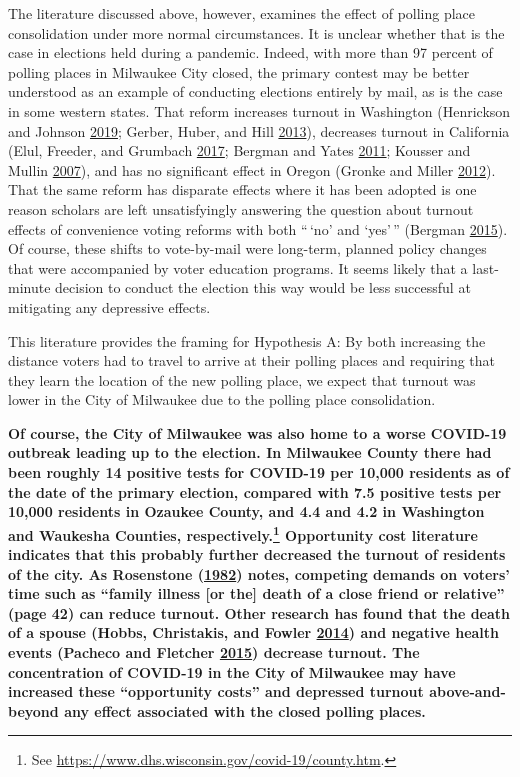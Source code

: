 \documentclass[
  12pt,
]{article}
\begin{document}
The literature discussed above, however, examines the effect of polling place consolidation under more normal circumstances. It is unclear whether that is the case in elections held during a pandemic. Indeed, with more than 97 percent of polling places in Milwaukee City closed, the primary contest may be better understood as an example of conducting elections entirely by mail, as is the case in some western states. That reform increases turnout in Washington (Henrickson and Johnson \protect\hyperlink{ref-Henrickson2019}{2019}; Gerber, Huber, and Hill \protect\hyperlink{ref-Gerber2013}{2013}), decreases turnout in California (Elul, Freeder, and Grumbach \protect\hyperlink{ref-Elul2017}{2017}; Bergman and Yates \protect\hyperlink{ref-Bergman2011}{2011}; Kousser and Mullin \protect\hyperlink{ref-Kousser2007}{2007}), and has no significant effect in Oregon (Gronke and Miller \protect\hyperlink{ref-Gronke2012}{2012}). That the same reform has disparate effects where it has been adopted is one reason scholars are left unsatisfyingly answering the question about turnout effects of convenience voting reforms with both ``\,`no' and `yes'\,'' (Bergman \protect\hyperlink{ref-Bergman2015}{2015}). Of course, these shifts to vote-by-mail were long-term, planned policy changes that were accompanied by voter education programs. It seems likely that a last-minute decision to conduct the election this way would be less successful at mitigating any depressive effects.

This literature provides the framing for Hypothesis A: By both increasing the distance voters had to travel to arrive at their polling places and requiring that they learn the location of the new polling place, we expect that turnout was lower in the City of Milwaukee due to the polling place consolidation.

\textbf{Of course, the City of Milwaukee was also home to a worse COVID-19 outbreak leading up to the election. In Milwaukee County there had been roughly 14 positive tests for COVID-19 per 10,000 residents as of the date of the primary election, compared with 7.5 positive tests per 10,000 residents in Ozaukee County, and 4.4 and 4.2 in Washington and Waukesha Counties, respectively.\footnote{See \url{https://www.dhs.wisconsin.gov/covid-19/county.htm}.} Opportunity cost literature indicates that this probably further decreased the turnout of residents of the city. As Rosenstone (\protect\hyperlink{ref-Rosenstone1982}{1982}) notes, competing demands on voters' time such as ``family illness {[}or the{]} death of a close friend or relative'' (page 42) can reduce turnout. Other research has found that the death of a spouse (Hobbs, Christakis, and Fowler \protect\hyperlink{ref-Hobbs2014}{2014}) and negative health events (Pacheco and Fletcher \protect\hyperlink{ref-Pacheco2015}{2015}) decrease turnout. The concentration of COVID-19 in the City of Milwaukee may have increased these ``opportunity costs'' and depressed turnout above-and-beyond any effect associated with the closed polling places.}
\end{document}
